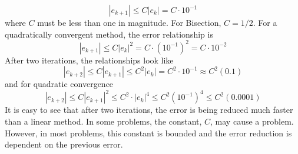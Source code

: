\documentclass[10pt,fleqn]{article}
\begin{document}
$$
  | e_{k+1} | \leq C | e_k | = C\cdot 10^{-1}
$$
where $C$ must be less than one in magnitude. For Bisection, $C={1/2}$. For a
quadratically convergent method, the error relationship is
$$
  | e_{k+1} | \leq C | e_k |^2 = C\cdot (10^{-1})^2 = C\cdot 10^{-2}
$$
After two iterations, the relationships look like
$$
  | e_{k+2} | \leq C | e_{k+1} | \leq C^2 | e_k | = C^2\cdot 10^{-1}
                  \approx C^2 (0.1)
$$
and for quadratic convergence
$$
  | e_{k+2} | \leq C | e_{k+1} |^2 \leq C^2\cdot | e_{k} |^4
               \leq C^2 (10^{-1})^4 \leq C^2 (0.0001)
$$
It is easy to see that after two iterations, the error is being reduced much
faster than a linear method. In some problems, the constant, $C$, may cause a
problem. However, in most problems, this constant is bounded and the error
reduction is dependent on the previous error.
\end{document}
